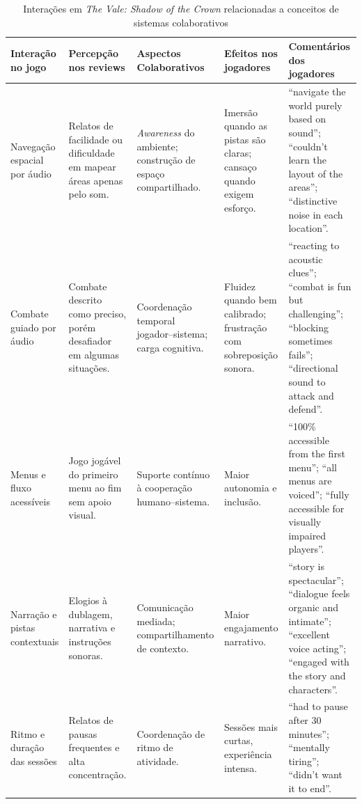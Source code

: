 \documentclass[12pt]{article}
\begin{document}
{{\begin{table}[H]
\centering
\caption{Interações em \textit{The Vale: Shadow of the Crown} relacionadas a conceitos de sistemas colaborativos}
\label{tabelaInteracoesColaborativas}
\footnotesize
\setlength{\tabcolsep}{4pt} %
\renewcommand{\arraystretch}{1.1} %

\begin{tabular}{|p{2.2cm}|p{2.6cm}|p{2.5cm}|p{2.5cm}|p{3.6cm}|}
\hline
\textbf{Interação no jogo} &
\textbf{Percepção nos reviews} &
\textbf{Aspectos Colaborativos} &
\textbf{Efeitos nos jogadores} &
\textbf{Comentários dos jogadores} \\
\hline

Navegação espacial por áudio &
Relatos de facilidade ou dificuldade em mapear áreas apenas pelo som. &
\textit{Awareness} do ambiente; construção de espaço compartilhado. &
Imersão quando as pistas são claras; cansaço quando exigem esforço. &
“navigate the world purely based on sound”; “couldn’t learn the layout of the areas”; “distinctive noise in each location”. \\
\hline

Combate guiado por áudio &
Combate descrito como preciso, porém desafiador em algumas situações. &
Coordenação temporal jogador--sistema; carga cognitiva. &
Fluidez quando bem calibrado; frustração com sobreposição sonora. &
“reacting to acoustic clues”; “combat is fun but challenging”; “blocking sometimes fails”; “directional sound to attack and defend”. \\
\hline

Menus e fluxo acessíveis &
Jogo jogável do primeiro menu ao fim sem apoio visual. &
Suporte contínuo à cooperação humano--sistema. &
Maior autonomia e inclusão. &
“100\% accessible from the first menu”; “all menus are voiced”; “fully accessible for visually impaired players”. \\
\hline

Narração e pistas contextuais &
Elogios à dublagem, narrativa e instruções sonoras. &
Comunicação mediada; compartilhamento de contexto. &
Maior engajamento narrativo. &
“story is spectacular”; “dialogue feels organic and intimate”; “excellent voice acting”; “engaged with the story and characters”. \\
\hline

Ritmo e duração das sessões &
Relatos de pausas frequentes e alta concentração. &
Coordenação de ritmo de atividade. &
Sessões mais curtas, experiência intensa. &
“had to pause after 30 minutes”; “mentally tiring”; “didn’t want it to end”. \\
\hline


\end{tabular}
\end{table}}}
\end{document}
